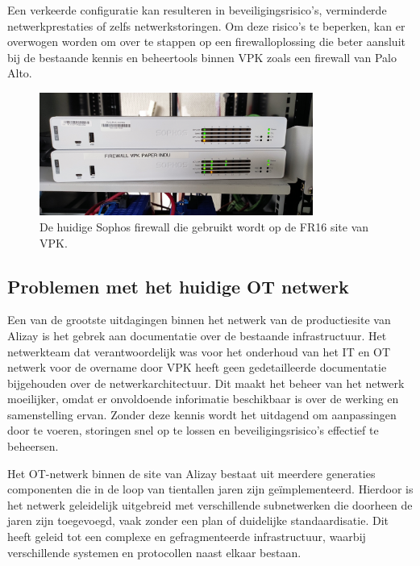 \vspace{5mm}
Een verkeerde configuratie kan resulteren in beveiligingsrisico’s, verminderde netwerkprestaties of zelfs netwerkstoringen. Om deze risico’s te beperken, kan er overwogen worden om over te stappen op een firewalloplossing die beter aansluit bij de bestaande kennis en beheertools binnen VPK zoals een firewall van Palo Alto.\newline

\begin{figure}[H]
    \centering
    \includegraphics[width=0.8\textwidth]{fotos/SophosFirewall.jpg}
    \caption[Sophos Firewall]{\label{fig:SophosFirewall}De huidige Sophos firewall die gebruikt wordt op de FR16 site van VPK.}
\end{figure} 

\subsection{Problemen met het huidige OT netwerk}
Een van de grootste uitdagingen binnen het netwerk van de productiesite van Alizay is het gebrek aan documentatie over de bestaande infrastructuur. Het netwerkteam dat verantwoordelijk was voor het onderhoud van het IT en OT netwerk voor de overname door VPK heeft geen gedetailleerde documentatie bijgehouden over de netwerkarchitectuur. Dit maakt het beheer van het netwerk moeilijker, omdat er onvoldoende inforimatie beschikbaar is over de werking en samenstelling ervan. Zonder deze kennis wordt het uitdagend om aanpassingen door te voeren, storingen snel op te lossen en beveiligingsrisico’s effectief te beheersen.

\vspace{5mm}
Het OT-netwerk binnen de site van Alizay bestaat uit meerdere generaties componenten die in de loop van tientallen jaren zijn geïmplementeerd. Hierdoor is het netwerk geleidelijk uitgebreid met verschillende subnetwerken die doorheen de jaren zijn toegevoegd, vaak zonder een plan of duidelijke standaardisatie. Dit heeft geleid tot een complexe en gefragmenteerde infrastructuur, waarbij verschillende systemen en protocollen naast elkaar bestaan.

